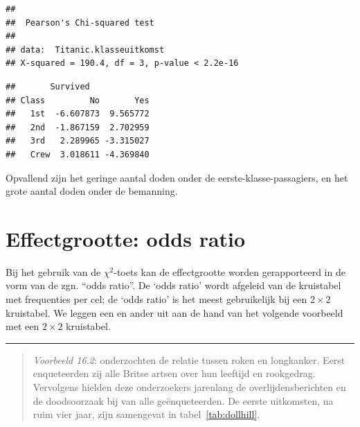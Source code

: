 \documentclass[
]{book}
\newenvironment{Shaded}{\begin{snugshade}}{\end{snugshade}}
\newcommand{\NormalTok}[1]{#1}
\newcommand{\OperatorTok}[1]{\textcolor[rgb]{0.81,0.36,0.00}{\textbf{#1}}}
\begin{document}
\begin{verbatim}
## 
##  Pearson's Chi-squared test
## 
## data:  Titanic.klasseuitkomst
## X-squared = 190.4, df = 3, p-value < 2.2e-16
\end{verbatim}

\begin{Shaded}
\end{Shaded}

\begin{verbatim}
##       Survived
## Class         No       Yes
##   1st  -6.607873  9.565772
##   2nd  -1.867159  2.702959
##   3rd   2.289965 -3.315027
##   Crew  3.018611 -4.369840
\end{verbatim}

Opvallend zijn het geringe aantal doden onder de eerste-klasse-passagiers, en het grote aantal doden onder de bemanning.

\hypertarget{effectgrootte-odds-ratio}{%
\section{Effectgrootte: odds ratio}\label{effectgrootte-odds-ratio}}

Bij het gebruik van de \(\chi^2\)-toets kan de effectgrootte worden gerapporteerd in de
vorm van de zgn. ``odds ratio''. De `odds ratio' wordt afgeleid van de
kruistabel met frequenties per cel; de `odds ratio' is het meest gebruikelijk bij een \(2\times2\) kruistabel.
We leggen een en ander uit aan de hand van het volgende voorbeeld met een \(2\times2\) kruistabel.

\begin{center}\rule{0.5\linewidth}{0.5pt}\end{center}

\begin{quote}
\emph{Voorbeeld 16.2}:
\citet{DollHill1956} onderzochten de relatie tussen roken en
longkanker. Eerst enqueteerden zij alle Britse artsen over hun leeftijd
en rookgedrag. Vervolgens hielden deze onderzoekers jarenlang de
overlijdensberichten en de doodsoorzaak bij van alle geënqueteerden. De
eerste uitkomsten, na ruim vier jaar, zijn samengevat in
tabel~\ref{tab:dollhill}.
\end{quote}
\end{document}
